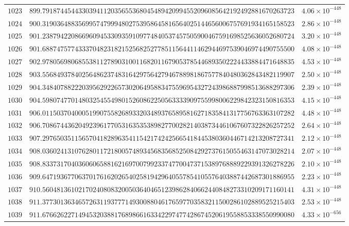 \documentclass[12pt,reqno]{amsart}
\theoremstyle{remark}
\begin{document}
\begin{longtable}{clc}
$1023$ & $899.7918744544330394112035655368045489420994552096085642192492881670263723$ & $4.06\times 10^{-448}$ \\
$1024$ & $900.3190364883569957479994802753958645816564025144656006757691934165158523$ & $2.86\times 10^{-448}$ \\
$1025$ & $901.2387942208669609453309359109774840537457505900467591698525636052680724$ & $3.20\times 10^{-448}$ \\
$1026$ & $901.6887475774333704823182152568252778511564411462944697539046974490755500$ & $4.08\times 10^{-448}$ \\
$1027$ & $902.9780569806855381127890310011682011679053785446893502224433884471648835$ & $4.53\times 10^{-448}$ \\
$1028$ & $903.5568493784025648623748316429756427946788981867577840480362843482119907$ & $2.50\times 10^{-448}$ \\
$1029$ & $904.3484078822203956292265730206495883475596954327243986887998513688297306$ & $2.39\times 10^{-448}$ \\
$1030$ & $904.5980747701480325455498015260862250563333909755998006229842323150816353$ & $4.15\times 10^{-448}$ \\
$1031$ & $906.0115037040005199075582689332034893765895816271835841317756763363107282$ & $4.48\times 10^{-448}$ \\
$1032$ & $906.7086744362049239617705316353538982770028214038734461067607322826257252$ & $2.64\times 10^{-448}$ \\
$1033$ & $907.2976503511565704182896354115421742425665418445380360446714213208727341$ & $2.12\times 10^{-448}$ \\
$1034$ & $908.0360241310762801172180057489345683568525084292737615055463147073028214$ & $2.07\times 10^{-448}$ \\
$1035$ & $908.8337317040360606588162169700799233747700473715389768889229391326278226$ & $2.10\times 10^{-448}$ \\
$1036$ & $909.6471936770637017616202654025819429640557854105576403887442687301886955$ & $2.23\times 10^{-448}$ \\
$1037$ & $910.5604813610217024080832005036404651239862840662440848273310209171160141$ & $4.31\times 10^{-448}$ \\
$1038$ & $911.3773013634657263119377714930088046176597703583211500286102889525215403$ & $2.53\times 10^{-448}$ \\
$1039$ & $911.6766262271494532038817689866163342297477428674520619558853338550990080$ & $4.33\times 10^{-656}$ \\
\end{longtable}
\normalsize
\setlength{\LTleft}{0pt}
\setlength{\LTright}{0pt}
\end{document}
